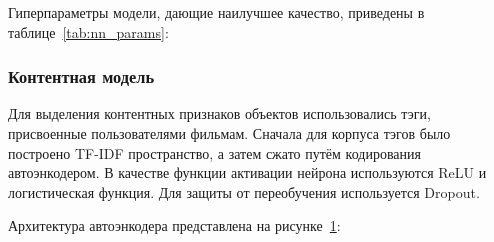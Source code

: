 Гиперпараметры модели, дающие наилучшее качество, приведены в таблице~\ref{tab:nn_params}:
\begin{table}[h]
    \caption{Гиперпараметры нейросети}
    \label{tab:nn_params}
\end{table}

\pagebreak
\subsubsection{Контентная модель}
Для выделения контентных признаков объектов использовались тэги, присвоенные пользователями фильмам.
Сначала для корпуса тэгов было построено TF-IDF пространство, а затем сжато путём кодирования автоэнкодером.
В качестве функции активации нейрона используются ReLU и логистическая функция.
Для защиты от переобучения используется Dropout.

Архитектура автоэнкодера представлена на рисунке~\ref{fig:autoencoder}:
\begin{figure}[h!]
    \caption{}
    \label{fig:autoencoder}
\end{figure}

